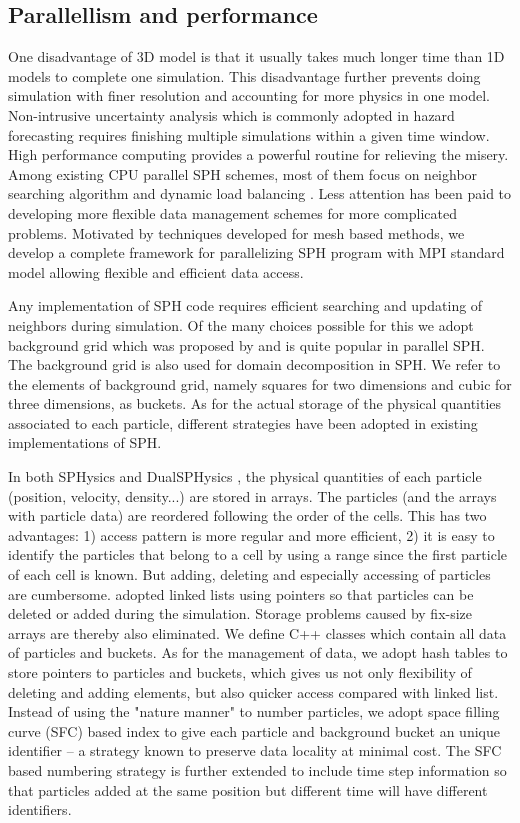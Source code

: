 \documentclass[journal abbreviation, manuscript]{copernicus}
\begin{document}
\subsection{Parallellism and performance}
One disadvantage of 3D model is that it usually takes much longer time than 1D models to complete one simulation. This disadvantage further prevents doing simulation with finer resolution and accounting for more physics in one model. Non-intrusive uncertainty analysis which is commonly adopted in hazard forecasting requires finishing multiple simulations within a given time window. High performance computing provides a powerful routine for relieving the misery. Among existing CPU parallel SPH schemes, most of them focus on neighbor searching algorithm and dynamic load balancing \citep[eg. ][] {ferrari2009new, crespo2015dualsphysics}. Less attention has been paid to developing more flexible data management schemes for more complicated problems. Motivated by techniques developed for mesh based methods, we develop a complete framework for parallelizing SPH program with MPI standard model allowing flexible and efficient data access.

Any implementation of SPH code requires efficient searching and updating of neighbors during simulation. Of the many choices possible for this we adopt background grid which was proposed by \citet {monaghan1985refined} and is quite popular in parallel SPH. The background grid is also used for domain decomposition in SPH. We refer to the elements of background grid, namely squares for two dimensions and cubic for three dimensions, as buckets. 
As for the actual storage of the physical quantities associated to each particle, different strategies have been adopted in existing implementations of SPH.

In both SPHysics and DualSPHysics \citep {crespo2015dualsphysics}, the physical quantities of each particle (position, velocity, density...) are stored in arrays. The particles (and the arrays with particle data) are reordered following the order of the cells. This has two advantages: 1) access pattern is more regular and more efficient, 2) it is easy to identify the particles that belong to a cell by using a range since the first particle of each cell is known. But adding, deleting and especially accessing of particles are cumbersome. \citet {ferrari2009new} adopted linked lists using pointers so that particles can be deleted or added during the simulation. Storage problems caused by fix-size arrays are thereby also eliminated. We define C++ classes which contain all data of particles and buckets. As for the management of data, we adopt hash tables to store pointers to particles and buckets, which gives us not only flexibility of deleting and adding elements, but also quicker access compared with linked list. Instead of using the "nature manner" to number particles, we adopt space filling curve (SFC) based index to give each particle and background bucket an unique identifier -- a strategy known to preserve data locality at minimal cost. The SFC based numbering strategy is further extended to include time step information so that particles added at the same position but different time will have different identifiers. 
\end{document}
